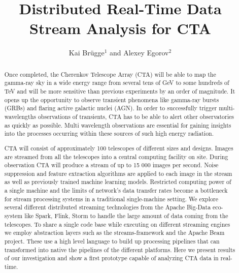 \documentclass[11pt,twoside]{article}
\begin{document}
\title{Distributed Real-Time Data Stream Analysis for CTA}

\author{Kai Br\"ugge$^1$  and Alexey Egorov$^2$}



\begin{abstract}

  Once completed, the  Cherenkov Telescope Array (CTA)  will be able to map the gamma-ray sky in a wide energy range from several tens of GeV to some hundreds of TeV and will be more sensitive than previous experiments by an order of magnitude.
  It opens up the opportunity to observe transient phenomena like gamma-ray bursts (GRBs) and flaring active galactic nuclei (AGN).  In order to successfully trigger multi-wavelengths observations of transients, CTA has to be able to alert other observatories as quickly as possible.  Multi wavelength observations are essential for gaining insights into the processes occurring within these sources of such high energy radiation.

  CTA will consist of approximately 100 telescopes of different sizes and designs.
  Images are streamed from all the telescopes into a central computing facility on site.
  During observation CTA will produce a stream of up to 15 000 images per second. Noise suppression and feature extraction algorithms are applied to each image in the stream as well as previously trained machine learning models.
  Restricted computing power of a single machine and the limits of network's data transfer rates become a bottleneck for stream processing systems in a traditional single-machine setting.
  We explore several different distributed streaming technologies from the Apache Big-Data eco-system like Spark, Flink, Storm to handle the large amount of data coming from the telescopes.
  To share a single code base while executing on different streaming engines we employ  abstraction layers such as the streams-framework and the Apache Beam project.
  These use  a high level language to build up processing pipelines that can transformed into native the pipelines of the different platforms.
  Here we present results of our investigation and show a first prototype capable of analyzing CTA data in real-time.

\end{abstract}
\end{document}
